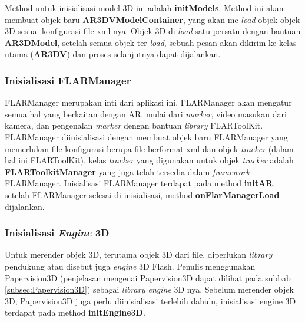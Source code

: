 Method untuk inisialisasi model 3D ini adalah \textbf{initModels}. Method ini akan membuat objek baru \textbf{AR3DVModelContainer}, yang akan me-\textit{load} objek-objek 3D sesuai konfigurasi file xml nya. Objek 3D di-\textit{load} satu persatu dengan bantuan \textbf{AR3DModel}, setelah semua objek ter-\textit{load}, sebuah pesan akan dikirim ke kelas utama (\textbf{AR3DV}) dan proses selanjutnya dapat dijalankan.

\subsubsection {Inisialisasi FLARManager}
\label{subsubsec:inisialisasi_flarmanager}
FLARManager merupakan inti dari aplikasi ini. FLARManager akan mengatur semua hal yang berkaitan dengan AR, mulai dari \textit{marker}, video masukan dari kamera, dan pengenalan \textit{marker} dengan bantuan \textit{library} FLARToolKit. FLARManager diinisialisasi dengan membuat objek baru FLARManager yang memerlukan file konfigurasi berupa file berformat xml dan objek \textit{tracker} (dalam hal ini FLARToolKit), kelas \textit{tracker} yang digunakan untuk objek \textit{tracker} adalah \textbf{FLARToolkitManager} yang juga telah tersedia dalam \textit{framework} FLARManager. Inisialisasi FLARManager terdapat pada method \textbf{initAR}, setelah FLARManager selesai di inisialisasi, method \textbf{onFlarManagerLoad} dijalankan.

\subsubsection {Inisialisasi \textit{Engine} 3D}
\label{subsubsec:inisialisasi_engine3d}
Untuk merender objek 3D, terutama objek 3D dari file, diperlukan \textit{library} pendukung atau disebut juga \textit{engine} 3D Flash. Penulis menggunakan Papervision3D (penjelasan mengenai Papervision3D dapat dilihat pada subbab \ref{subsec:Papervision3D}) sebagai \textit{library engine} 3D nya. Sebelum merender objek 3D, Papervision3D juga perlu diinisialisasi terlebih dahulu, inisialisasi engine 3D terdapat pada method \textbf{initEngine3D}.

